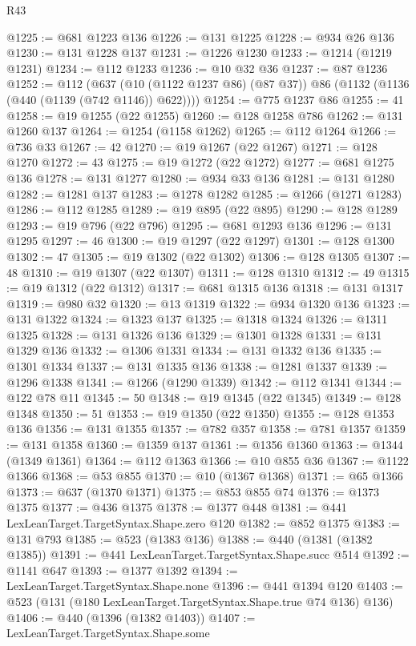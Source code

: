 \begin{lexlean}{R43}
\begin{coremodule}
@1225 := @681 @1223 @136
@1226 := @131 @1225
@1228 := @934 @26 @136
@1230 := @131 @1228 @137
@1231 := @1226 @1230
@1233 := @1214 (@1219 @1231)
@1234 := @112 @1233
@1236 := @10 @32 @36
@1237 := @87 @1236
@1252 := @112
    (@637 (@10 (@1122 @1237 @86) (@87 @37)) @86 (@1132 (@1136 (@440 (@1139 (@742 @1146)) @622))))
@1254 := @775 @1237 @86
@1255 := 41
@1258 := @19 @1255 (@22 @1255)
@1260 := @128 @1258 @786
@1262 := @131 @1260 @137
@1264 := @1254 (@1158 @1262)
@1265 := @112 @1264
@1266 := @736 @33
@1267 := 42
@1270 := @19 @1267 (@22 @1267)
@1271 := @128 @1270
@1272 := 43
@1275 := @19 @1272 (@22 @1272)
@1277 := @681 @1275 @136
@1278 := @131 @1277
@1280 := @934 @33 @136
@1281 := @131 @1280
@1282 := @1281 @137
@1283 := @1278 @1282
@1285 := @1266 (@1271 @1283)
@1286 := @112 @1285
@1289 := @19 @895 (@22 @895)
@1290 := @128 @1289
@1293 := @19 @796 (@22 @796)
@1295 := @681 @1293 @136
@1296 := @131 @1295
@1297 := 46
@1300 := @19 @1297 (@22 @1297)
@1301 := @128 @1300
@1302 := 47
@1305 := @19 @1302 (@22 @1302)
@1306 := @128 @1305
@1307 := 48
@1310 := @19 @1307 (@22 @1307)
@1311 := @128 @1310
@1312 := 49
@1315 := @19 @1312 (@22 @1312)
@1317 := @681 @1315 @136
@1318 := @131 @1317
@1319 := @980 @32
@1320 := @13 @1319
@1322 := @934 @1320 @136
@1323 := @131 @1322
@1324 := @1323 @137
@1325 := @1318 @1324
@1326 := @1311 @1325
@1328 := @131 @1326 @136
@1329 := @1301 @1328
@1331 := @131 @1329 @136
@1332 := @1306 @1331
@1334 := @131 @1332 @136
@1335 := @1301 @1334
@1337 := @131 @1335 @136
@1338 := @1281 @1337
@1339 := @1296 @1338
@1341 := @1266 (@1290 @1339)
@1342 := @112 @1341
@1344 := @122 @78 @11
@1345 := 50
@1348 := @19 @1345 (@22 @1345)
@1349 := @128 @1348
@1350 := 51
@1353 := @19 @1350 (@22 @1350)
@1355 := @128 @1353 @136
@1356 := @131 @1355
@1357 := @782 @357
@1358 := @781 @1357
@1359 := @131 @1358
@1360 := @1359 @137
@1361 := @1356 @1360
@1363 := @1344 (@1349 @1361)
@1364 := @112 @1363
@1366 := @10 @855 @36
@1367 := @1122 @1366
@1368 := @53 @855
@1370 := @10 (@1367 @1368)
@1371 := @65 @1366
@1373 := @637 (@1370 @1371)
@1375 := @853 @855 @74
@1376 := @1373 @1375
@1377 := @436 @1375
@1378 := @1377 @448
@1381 := @441 LexLeanTarget.TargetSyntax.Shape.zero @120
@1382 := @852 @1375
@1383 := @131 @793
@1385 := @523 (@1383 @136)
@1388 := @440 (@1381 (@1382 @1385))
@1391 := @441 LexLeanTarget.TargetSyntax.Shape.succ @514
@1392 := @1141 @647
@1393 := @1377 @1392
@1394 := LexLeanTarget.TargetSyntax.Shape.none
@1396 := @441 @1394 @120
@1403 := @523 (@131 (@180 LexLeanTarget.TargetSyntax.Shape.true @74 @136) @136)
@1406 := @440 (@1396 (@1382 @1403))
@1407 := LexLeanTarget.TargetSyntax.Shape.some

\end{coremodule}
\end{lexlean}
